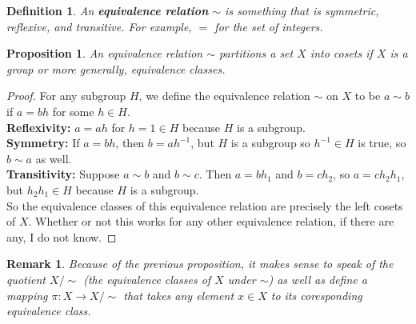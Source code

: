 \documentclass{article}
\theoremstyle{norm}
\newtheorem{df}[thm]{Definition}
\newtheorem{rem}[thm]{Remark}
\newtheorem{prop}[thm]{Proposition}
\begin{document}
\begin{df}
An \textbf{equivalence relation} $\sim$ is something that is symmetric,
reflexive, and transitive. For example, $=$ for the set of integers.
\end{df}
\begin{prop}
An equivalence relation $\sim$ partitions a set $X$ into cosets if $X$
is a group or more generally, equivalence classes.
\end{prop}
\begin{proof}
For any subgroup $H$, we define the equivalence relation $\sim$ on $X$
to be $a \sim b$ if $a = bh$ for some $h \in H$. \\
\textbf{Reflexivity:} $a = ah$ for $h = 1 \in H$ because $H$ is a
subgroup. \\
\textbf{Symmetry:} If $a = bh$, then $b = ah^{-1}$, but $H$ is a
subgroup so $h^{-1} \in H$ is true, so $b \sim a$ as well. \\
\textbf{Transitivity:} Suppose $a \sim b$ and $b \sim c$. Then $a =
bh_1$ and $b = ch_2$, so $a = ch_2h_1$, but $h_2 h_1 \in H$ because $H$
is a subgroup. \\
So the equivalence classes of this equivalence relation are precisely
the left cosets of $X$. Whether or not this works for any other
equivalence relation, if there are any, I do not know.
\end{proof}
\begin{rem}
Because of the previous proposition, it makes sense to speak of the
quotient $X/\sim$ (the equivalence classes of $X$ under $\sim$) as well
as define a mapping $\pi : X \rightarrow X/\sim$ that takes any element
$x \in X$ to its coresponding equivalence class.
\end{rem}
\end{document}
